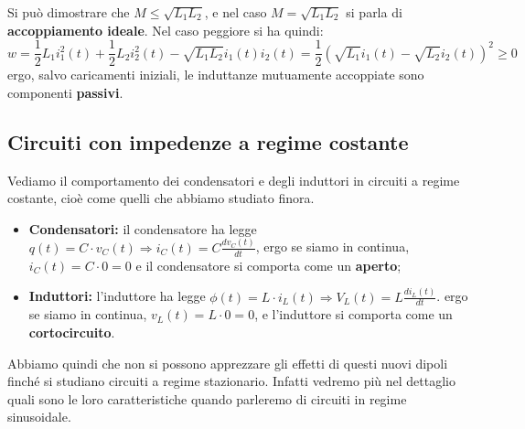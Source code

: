 \documentclass[a4paper,11pt]{article}
\begin{document}
Si può dimostrare che $ M \leq \sqrt{L_1 L_2}$, e nel caso $M = \sqrt{L_1 L_2}$ si parla di \textbf{accoppiamento ideale}. Nel caso peggiore si ha quindi:
$$
w = \frac{1}{2} L_1 i_1^2(t) + \frac{1}{2} L_2 i_2^2(t) - \sqrt{L_1 L_2} i_1(t) i_2(t) = \frac{1}{2}\left( \sqrt{L_1} i_1(t) - \sqrt{L_2} i_2(t) \right)^2 \geq 0
$$
ergo, salvo caricamenti iniziali, le induttanze mutuamente accoppiate sono componenti \textbf{passivi}.

\subsection{Circuiti con impedenze a regime costante}
Vediamo il comportamento dei condensatori e degli induttori in circuiti a regime costante, cioè come quelli che abbiamo studiato finora.
\begin{itemize}
	\item \textbf{Condensatori:} il condensatore ha legge $q(t) = C \cdot v_C(t) \Rightarrow i_C(t) = C \frac{dv_C(t)}{dt}$, ergo se siamo in continua, $i_C(t) = C \cdot 0 = 0$ e il condensatore si comporta come un \textbf{aperto};
	\item \textbf{Induttori:} l'induttore ha legge $\phi(t) = L \cdot i_L(t) \Rightarrow V_L(t) = L \frac{di_L(t)}{dt}$. ergo se siamo in continua, $v_L (t) = L \cdot 0 = 0$, e l'induttore si comporta come un \textbf{cortocircuito}.
\end{itemize}
Abbiamo quindi che non si possono apprezzare gli effetti di questi nuovi dipoli finché si studiano circuiti a regime stazionario.
Infatti vedremo più nel dettaglio quali sono le loro caratteristiche quando parleremo di circuiti in regime sinusoidale.
\end{document}
